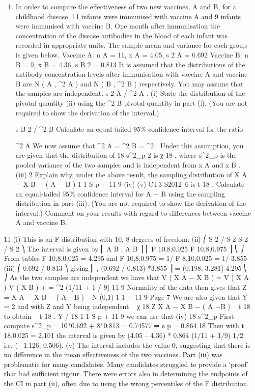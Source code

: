 \documentclass[a4paper,12pt]{article}
\begin{document}
\begin{enumerate}
\item 
In order to compare the effectiveness of two new vaccines, A and B, for a childhood
disease, 11 infants were immunised with vaccine A and 9 infants were immunised
with vaccine B. One month after immunisation the concentration of the disease
antibodies in the blood of each infant was recorded in appropriate units. The sample
mean and variance for each group is given below.
Vaccine A: n A = 11, x A = 4.05, s 2 A = 0.692
Vaccine B: n B = 9, x B = 4.36, s B 2 = 0.813
It is assumed that the distributions of the antibody concentration levels after
immunisation with vaccine A and vaccine B are N ( \mu A , \sigma^2 A ) and N ( \mu B , \sigma^2 B )
respectively. You may assume that the samples are independent.
s 2 A / \sigma^2 A
.
(i) State the distribution of the pivotal quantity
(ii) using the
\sigma^2 B
pivotal quantity in part (i). (You are not required to show the derivation of the
interval.)

s B 2 / \sigma^2 B
Calculate an equal-tailed 95\% confidence interval for the ratio

\sigma^2 A
We now assume that \sigma^2 A = \sigma^2 B = \sigma^2 . Under this assumption, you are given that the
distribution of
18 s^2_p
2
is χ 18
, where s^2_p is the pooled variance of the two samples and
\sigma
is independent from x A and x B .
(iii)
2
Explain why, under the above result, the sampling distribution of
X A − X B − ( \mu A − \mu B )
1 1
S p
+
11 9
(iv)
(v)
CT3 S2012–6
is t 18 . 
Calculate an equal-tailed 95\% confidence interval for \mu A − \mu B using the
sampling distribution in part (iii). (You are not required to show the
derivation of the interval.) 
Comment on your results with regard to differences between vaccine A and
vaccine B.
\end{enumerate}
\newpage

11
(i) This is an F distribution with 10, 8 degrees of freedom.
(ii) ⎛ S 2 / S 2
S 2 / S 2 ⎞
The interval is given by ⎜ A B , A B ⎟
⎜ F 10,8,0.025 F 10,8,0.975 ⎟
⎝
⎠
From tables F 10,8,0.025 = 4.295 and F 10,8,0.975 = 1/ F 8,10,0.025 = 1/ 3.855
(iii)
⎛ 0.692 / 0.813
⎞
giving ⎜
, (0.692 / 0.813) *3.855 ⎟ = (0.198, 3.281)
4.295
⎝
⎠
As the two samples are independent we have that
V ( X A − X B ) =
V ( X A ) V ( X B )
+
= \sigma^2 (1/11 + 1 / 9)
11
9
Normality of the data then gives that Z =
X A − X B − ( \mu A −\mu B )
~ N (0,1)
1 1
\sigma
+
11 9
Page 7%
We are also given that Y =
2
and with Z and Y being independent
~ χ 18
Z
X A − X B − ( \mu A −\mu B )
~ t 18 to obtain
~ t 18 .
Y / 18
1 1
S p
+
11 9
we can use that
(iv)
18 s^2_p
First compute s^2_p =
10*0.692 + 8*0.813
= 0.74577 ⇒ s p = 0.864
18
Then with t 18,0.025 = 2.101 the interval is given by (4.05 – 4.36)  *
0.864 (1/11 + 1/9) 1/2 i.e. (– 1.126, 0.506).
(v)
The interval includes the value 0, suggesting that there is no difference in the
mean effectiveness of the two vaccines.
Part (iii) was problematic for many candidates. Many candidates struggled to provide a
‘proof’ that had sufficient rigour. There were errors also in determining the endpoints of the
CI in part (ii), often due to using the wrong percentiles of the F distribution.
\end{document}
